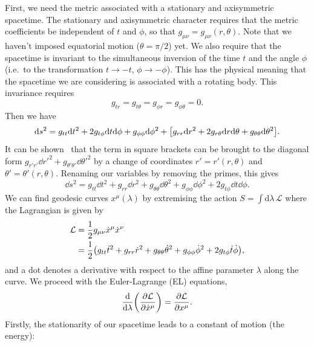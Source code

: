 First, we need the metric associated with a stationary and axisymmetric spacetime. 
The stationary and axisymmetric character requires that the metric coefficients be independent of $t$ and $\phi$, so that $g_{\mu \nu} = g_{\mu \nu}(r,\theta)$. 
Note that we haven't imposed equatorial motion ($\theta = \pi/2$) yet.
We also require that the spacetime is invariant to the simultaneous inversion of the time $t$ and the angle $\phi$ (i.e.\ to the transformation $t \rightarrow -t$, $\phi \rightarrow -\phi$). 
This has the physical meaning that the spacetime we are considering is associated with a rotating body. 
This invariance requires 
\begin{equation}
	g_{tr} = g_{t \theta} = g_{\phi r} = g_{\phi \theta} = 0.
\end{equation}
Then we have 
\begin{equation}
	\dd s^2 = g_{tt}\dd t^2 + 2g_{t \phi} \dd t \dd \phi + g_{\phi \phi}\dd \phi^2 + \qty[ g_{rr}\dd r^2 + 2g_{r \theta} \dd r \dd \theta + g_{\theta \theta} \dd \theta^2 ].
\end{equation}
It can be shown~\cite{Chandrasekhar:1985kt} that the term in square brackets can be brought to the diagonal form $g_{r'r'}\dd r'^2 +  g_{\theta' \theta'} \dd \theta'^2$ by a change of coordinates $r'=r'(r,\theta)$ and $\theta'=\theta'(r,\theta)$.
Renaming our variables by removing the primes, this gives
\begin{equation}
	\dd s^2 = g_{tt}\dd t^2 + g_{rr}\dd r^2 + g_{\theta \theta}\dd \theta^2 + g_{\phi \phi}\dd \phi^2 + 2g_{t \phi}\dd t\dd \phi.
\end{equation}
We can find geodesic curves $x^\mu(\lambda)$ by extremising the action $S=\int\mathrm{d}\lambda\,\mathcal{L}$ where the Lagrangian is given by
\begin{align}
	\mathcal{L} &= \frac{1}{2}g_{\mu \nu} \dot{x}^\mu \dot{x}^\nu \\
	&= \frac{1}{2}\qty(g_{tt}\dot{t}^2 + g_{rr}\dot{r}^2 + g_{\theta \theta}\dot{\theta}^2 + g_{\phi \phi}\dot{\phi}^2 + 2g_{t \phi}\dot{t}\dot{\phi}), \nonumber
\end{align}
and a dot denotes a derivative with respect to the affine parameter $\lambda$ along the curve. 
We proceed with the Euler-Lagrange (EL) equations, 
\begin{gather} \label{eq:ELeqns_1}
	\dv{\lambda}(\pdv{\mathcal{L}}{\dot{x}^\mu}) = \pdv{\mathcal{L}}{x^\mu}.
\end{gather}
Firstly, the stationarity of our spacetime leads to a constant of motion (the energy):
